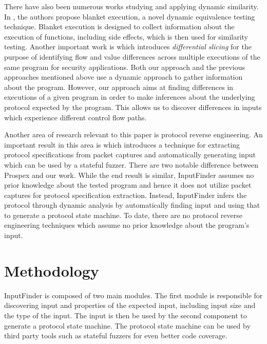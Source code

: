 \documentclass{acm_proc_article-sp}
\def \tool {InputFinder}
\begin{document}
There have also been numerous works studying and applying dynamic similarity.
In \cite{blanketexec}, the authors propose blanket execution, a novel dynamic equivalence testing technique.
Blanket execution is designed to collect information about the execution of functions, including side effects, which is then used for similarity testing.
Another important work is \cite{differential} which introduces \textit{differential slicing} for the purpose of identifying flow and value differences across multiple executions of the same program for security applications.
Both our approach and the previous approaches mentioned above use a dynamic approach to gather information about the program.
However, our approach aims at finding differences in executions of a given program in order to make inferences about the underlying protocol expected by the program.
This allows us to discover differences in inputs which experience different control flow paths.


Another area of research relevant to this paper is protocol reverse engineering.
An important result in this area is \cite{prospex} which introduces a technique for extracting protocol specifications from packet captures and automatically generating input which can be used by a stateful fuzzer.
There are two notable difference between Prospex and our work.
While the end result is similar, \tool{} assumes no prior knowledge about the tested program and hence it does not utilize packet captures for protocol specification extraction.
Instead, \tool{} infers the protocol through dynamic analysis by automatically finding input and using that to generate a protocol state machine.
To date, there are no protocol reverse engineering techniques which assume no prior knowledge about the program's input.

\section{Methodology} \label{methodology}

\tool{} is composed of two main modules.
The first module is responsible for discovering input and properties of the expected input, including input size and the type of the input.
The input is then be used by the second component to generate a protocol state machine.
The protocol state machine can be used by third party tools such as stateful fuzzers for even better code coverage.
\end{document}
